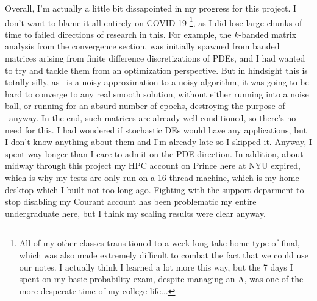 Overall, I'm actually a little bit dissapointed in my progress for this project.
I don't want to blame it all entirely on COVID-19%
\footnote{
  All of my other classes transitioned to a week-long take-home type of final,
  which was also made extremely difficult to combat the fact that we could use
  our notes. I actually think I learned a lot more this way, but the 7 days
  I spent on my basic probability exam, despite managing an A, was one of the more
  desperate time of my college life...
}, as I did lose large chunks of time to failed directions of research in this.
For example, the $k$-banded matrix analysis from the convergence section, was
initially spawned from banded matrices arising from finite difference
discretizations of PDEs, and I had wanted to try and tackle them from an
optimization perspective. But in hindsight this is totally silly, as \hogwild\
is a noisy approximation to a noisy algorithm, it was going to be hard to
converge to any real smooth solution, without either running into a noise ball,
or running for an absurd number of epochs, destroying the purpose of \hogwild\
anyway. In the end, such matrices are already well-conditioned, so there's no
need for this. I had wondered if stochastic DEs would have any applications, but
I don't know anything about them and I'm already late so I skipped it. Anyway,
I spent way longer than I care to admit on the PDE direction. In addition, about
midway through this project my HPC account on Prince here at NYU expired, which
is why my tests are only run on a 16 thread machine, which is my home desktop
which I built not too long ago. Fighting with the support deparment to stop
disabling my Courant account has been problematic my entire undergraduate here,
but I think my scaling results were clear anyway.
